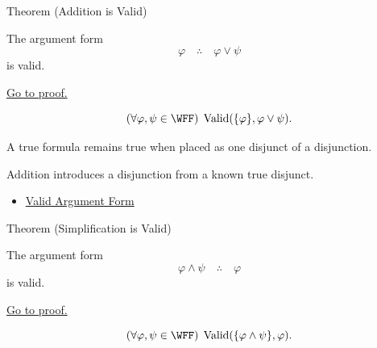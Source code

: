 \begin{theorembox}{Theorem (Addition is Valid)}
\begin{theorem}
\label{thm:addition-validity-propositional-logic}
The argument form
\[
\varphi \quad\therefore\quad \varphi\lor\psi
\]
is valid.

\noindent\hyperref[prf:addition-validity-propositional-logic]{Go to proof.}
\end{theorem}
\end{theorembox}

\begin{remark*}
\[
(\forall\varphi,\psi\in\WFF)\;\operatorname{Valid}(\{\varphi\},\varphi\lor\psi).
\]
\end{remark*}



\begin{remark*}[Interpretation]
A true formula remains true when placed as one disjunct of a disjunction.

Addition introduces a disjunction from a known true disjunct.
\end{remark*}

\begin{dependencies}
\begin{itemize}
  \item \hyperref[def:valid-argument-form-propositional-logic]{Valid Argument Form}
\end{itemize}
\end{dependencies}

\begin{theorembox}{Theorem (Simplification is Valid)}
\begin{theorem}
\label{thm:simplification-validity-propositional-logic}
The argument form
\[
\varphi\land\psi \quad\therefore\quad \varphi
\]
is valid.

\noindent\hyperref[prf:simplification-validity-propositional-logic]{Go to proof.}
\end{theorem}
\end{theorembox}

\begin{remark*}
\[
(\forall\varphi,\psi\in\WFF)\;\operatorname{Valid}(\{\varphi\land\psi\},\varphi).
\]
\end{remark*}



